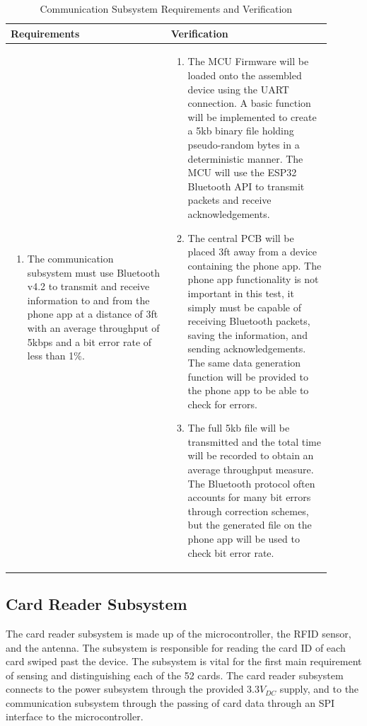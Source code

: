\documentclass[12pt]{article}
\begin{document}
\begin{table}[!h]
	\caption{Communication Subsystem Requirements and Verification}
	\label{tab:comms_rv}
	\centering
	\begin{tabular}{| p{0.45\linewidth} | p{0.45\linewidth} |} 
 		\hline
 		\textbf{Requirements} & \textbf{Verification} \\ 
 		\hline
 		\begin{enumerate}
 			\item The communication subsystem must use Bluetooth v4.2 \cite{IEEE_bt} to transmit and receive information to and from the phone app at a distance of 3ft with an average throughput of 5kbps and a bit error rate of less than 1\%.
		\end{enumerate} & \begin{enumerate}[label=\alph*)]
 			\item The MCU Firmware will be loaded onto the assembled device using the UART connection. A basic function will be implemented to create a 5kb binary file holding pseudo-random bytes in a deterministic manner. The MCU will use the ESP32 Bluetooth API to transmit packets and receive acknowledgements.
 			\item The central PCB will be placed 3ft away from a device containing the phone app. The phone app functionality is not important in this test, it simply must be capable of receiving Bluetooth packets, saving the information, and sending acknowledgements. The same data generation function will be provided to the phone app to be able to check for errors.
 			\item The full 5kb file will be transmitted and the total time will be recorded to obtain an average throughput measure. The Bluetooth protocol often accounts for many bit errors through correction schemes, but the generated file on the phone app will be used to check bit error rate.
		\end{enumerate} \\
 		\hline
	\end{tabular}
\end{table}

\subsection{Card Reader Subsystem}

The card reader subsystem is made up of the microcontroller, the RFID sensor, and the antenna. The subsystem is responsible for reading the card ID of each card swiped past the device. The subsystem is vital for the first main requirement of sensing and distinguishing each of the 52 cards. The card reader subsystem connects to the power subsystem through the provided $3.3V_{DC}$ supply, and to the communication subsystem through the passing of card data through an SPI interface to the microcontroller.
\end{document}
